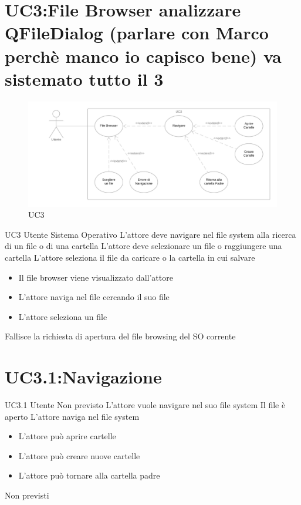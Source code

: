 \documentclass[../AnalisideiRequisiti.tex]{subfiles}
\begin{document}
	\section{UC3:File Browser analizzare QFileDialog (parlare con Marco perchè manco io capisco bene) va sistemato tutto il 3}
	\begin{figure}[H]
		\caption{UC3}
		\centering
		\includegraphics[width=\textwidth]{../img/UC03.png}
	\end{figure}
	\UserCase
	{UC3}
	{Utente}
	{Sistema Operativo}
	{L'attore deve navigare nel file system alla ricerca di un file o di una cartella}
	{L'attore deve selezionare un file o raggiungere una cartella}
	{L'attore seleziona il file da caricare o la cartella in cui salvare}
	{
		\begin{itemize}
			\item{} Il file browser viene visualizzato dall'attore
			\item{} L'attore naviga nel file  cercando il suo file 
			\item{} L'attore seleziona un file 
		\end{itemize}
	}
	{Fallisce la richiesta di apertura del file browsing del SO corrente}
	\section{UC3.1:Navigazione}
	\UserCase
	{UC3.1}
	{Utente}
	{Non previsto}
	{L'attore vuole navigare nel suo file system}
	{Il file  è aperto}
	{L'attore naviga nel file system}
	{
		\begin{itemize}
			\item{} L'attore può aprire cartelle 
			\item{} L'attore può creare nuove cartelle 
			\item{} L'attore può tornare alla cartella padre 
		\end{itemize}
	}
	{Non previsti}	
\end{document}
